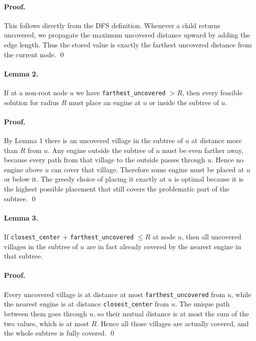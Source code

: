 \documentclass[11pt]{article}
\begin{document}
\paragraph{Proof.}
This follows directly from the DFS definition. Whenever a child returns uncovered, we propagate the maximum uncovered distance upward by adding the edge length. Thus the stored value is exactly the farthest uncovered distance from the current node. \qed

\paragraph{Lemma 2.}
If at a non-root node $u$ we have \texttt{farthest\_uncovered} $> R$, then every feasible solution for radius $R$ must place an engine at $u$ or inside the subtree of $u$.

\paragraph{Proof.}
By Lemma 1 there is an uncovered village in the subtree of $u$ at distance more than $R$ from $u$. Any engine outside the subtree of $u$ must be even farther away, because every path from that village to the outside passes through $u$. Hence no engine above $u$ can cover that village. Therefore some engine must be placed at $u$ or below it. The greedy choice of placing it exactly at $u$ is optimal because it is the highest possible placement that still covers the problematic part of the subtree. \qed

\paragraph{Lemma 3.}
If \texttt{closest\_center} $+$ \texttt{farthest\_uncovered} $\le R$ at node $u$, then all uncovered villages in the subtree of $u$ are in fact already covered by the nearest engine in that subtree.

\paragraph{Proof.}
Every uncovered village is at distance at most \texttt{farthest\_uncovered} from $u$, while the nearest engine is at distance \texttt{closest\_center} from $u$. The unique path between them goes through $u$, so their mutual distance is at most the sum of the two values, which is at most $R$. Hence all those villages are actually covered, and the whole subtree is fully covered. \qed
\end{document}
